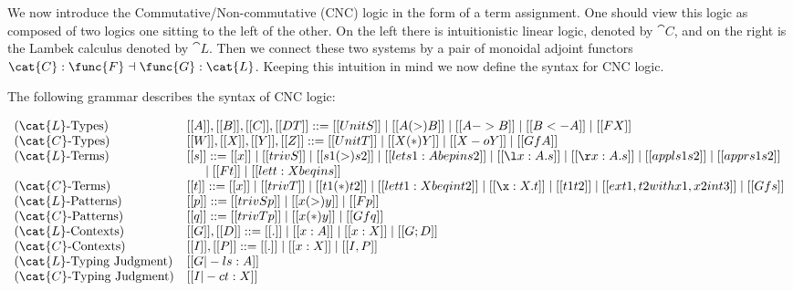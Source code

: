 We now introduce the Commutative/Non-commutative (CNC) logic in the
form of a term assignment.  One should view this logic as composed of
two logics one sitting to the left of the other.  On the left there is
intuitionistic linear logic, denoted by $\cat{C}$, and on the right is
the Lambek calculus denoted by $\cat{L}$.  Then we connect these two
systems by a pair of monoidal adjoint functors $\cat{C} : \func{F}
\dashv \func{G} : \cat{L}$.  Keeping this intuition in mind we now
define the syntax for CNC logic.
\begin{definition}
  \label{def:Lambek-syntax}
  The following grammar describes the syntax of CNC logic:
  \begin{center}\vspace{-5px}
    \begin{math}
      \begin{array}{lll}
        \text{($\cat{L}$-Types)} & [[A]],[[B]],[[C]],[[DT]] ::= [[UnitS]] \mid [[A (>) B]] \mid [[A -> B]] \mid [[B <- A]] \mid [[F X]]\\
        \text{($\cat{C}$-Types)} & [[W]],[[X]],[[Y]],[[Z]] ::= [[UnitT]] \mid [[X (*) Y]] \mid [[X -o Y]] \mid [[Gf A]]\\
        \text{($\cat{L}$-Terms)} & [[s]] ::= [[x]] \mid [[trivS]] \mid [[s1 (>) s2]] \mid [[let s1 : A be p in s2]] \mid [[\l x : A.s]] \mid [[\r x : A . s]] \mid [[appl s1 s2]] \mid [[appr s1 s2]] \\
        & \,\,\,\,\,\,\,\,\,\mid [[F t]] \mid [[let t : X be q in s]]\\
        \text{($\cat{C}$-Terms)} & [[t]] ::= [[x]] \mid [[trivT]] \mid [[t1 (*) t2]] \mid [[let t1 : X be q in t2]] \mid [[\x:X.t]] \mid [[t1 t2]] \mid [[ex t1 , t2 with x1 , x2 in t3]] \mid [[Gf s]]\\
        \text{($\cat{L}$-Patterns)} & [[p]] ::= [[trivSp]] \mid [[x (>) y]] \mid [[F p]]\\
        \text{($\cat{C}$-Patterns)} & [[q]] ::= [[trivTp]] \mid [[x (*) y]] \mid [[Gf q]]\\
        \text{($\cat{L}$-Contexts)} & [[G]],[[D]] ::= [[.]] \mid [[x : A]] \mid [[x : X]] \mid [[G;D]]\\
        \text{($\cat{C}$-Contexts)} & [[I]],[[P]] ::= [[.]] \mid [[x : X]] \mid [[I,P]]\\
        \text{($\cat{L}$-Typing Judgment)} & [[G |-l s : A]]\\
        \text{($\cat{C}$-Typing Judgment)} & [[I |-c t : X]]\\
      \end{array}
    \end{math}
  \end{center}
\end{definition}


